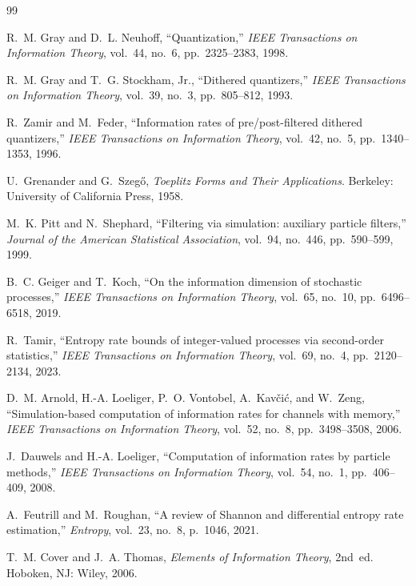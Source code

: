 \documentclass[11pt]{article}
\begin{document}
\begin{thebibliography}{99}

R.~M. Gray and D.~L. Neuhoff, ``Quantization,'' \emph{IEEE Transactions on
Information Theory}, vol.~44, no.~6, pp.~2325--2383, 1998.

R.~M. Gray and T.~G. Stockham, Jr., ``Dithered quantizers,'' \emph{IEEE
Transactions on Information Theory}, vol.~39, no.~3, pp.~805--812, 1993.

R.~Zamir and M.~Feder, ``Information rates of pre/post-filtered dithered
quantizers,'' \emph{IEEE Transactions on Information Theory}, vol.~42, no.~5,
pp.~1340--1353, 1996.

U.~Grenander and G.~Szeg\H{o}, \emph{Toeplitz Forms and Their Applications}.
Berkeley: University of California Press, 1958.

M.~K. Pitt and N.~Shephard, ``Filtering via simulation: auxiliary particle
filters,'' \emph{Journal of the American Statistical Association}, vol.~94,
no.~446, pp.~590--599, 1999.

B.~C. Geiger and T.~Koch, ``On the information dimension of stochastic
processes,'' \emph{IEEE Transactions on Information Theory}, vol.~65,
no.~10, pp.~6496--6518, 2019.

R.~Tamir, ``Entropy rate bounds of integer-valued processes via second-order
statistics,'' \emph{IEEE Transactions on Information Theory}, vol.~69,
no.~4, pp.~2120--2134, 2023.

D.~M. Arnold, H.-A. Loeliger, P.~O. Vontobel, A.~Kav\v{c}i\'c, and W.~Zeng,
``Simulation-based computation of information rates for channels with
memory,'' \emph{IEEE Transactions on Information Theory}, vol.~52, no.~8,
pp.~3498--3508, 2006.

J.~Dauwels and H.-A. Loeliger, ``Computation of information rates by particle
methods,'' \emph{IEEE Transactions on Information Theory}, vol.~54, no.~1,
pp.~406--409, 2008.

A.~Feutrill and M.~Roughan, ``A review of Shannon and differential entropy
rate estimation,'' \emph{Entropy}, vol.~23, no.~8, p.~1046, 2021.

T.~M. Cover and J.~A. Thomas, \emph{Elements of Information Theory}, 2nd~ed.
Hoboken, NJ: Wiley, 2006.


\end{thebibliography}
\end{document}
